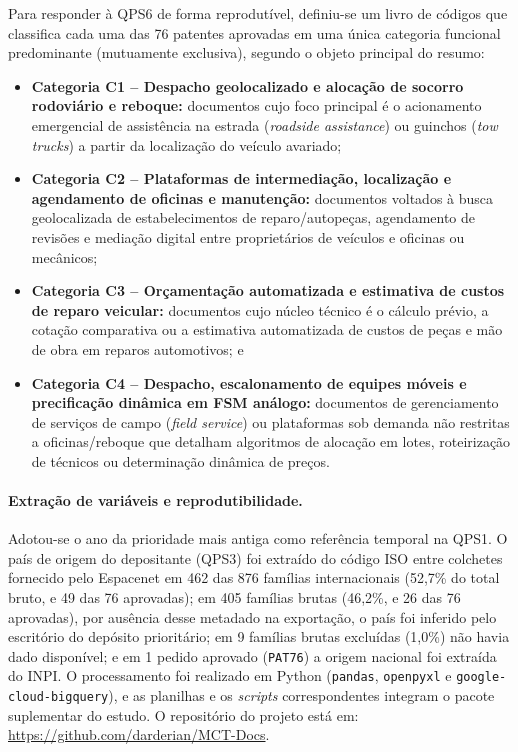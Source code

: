 \documentclass[12pt,a4paper]{article}
\begin{document}
Para responder à QPS6 de forma reprodutível, definiu-se um livro de códigos que classifica cada uma das 76 patentes aprovadas em uma única categoria funcional predominante (mutuamente exclusiva), segundo o objeto principal do resumo:
\begin{itemize}
    \item \textbf{Categoria C1 -- Despacho geolocalizado e alocação de socorro rodoviário e reboque:} documentos cujo foco principal é o acionamento emergencial de assistência na estrada (\textit{roadside assistance}) ou guinchos (\textit{tow trucks}) a partir da localização do veículo avariado;
    \item \textbf{Categoria C2 -- Plataformas de intermediação, localização e agendamento de oficinas e manutenção:} documentos voltados à busca geolocalizada de estabelecimentos de reparo/autopeças, agendamento de revisões e mediação digital entre proprietários de veículos e oficinas ou mecânicos;
    \item \textbf{Categoria C3 -- Orçamentação automatizada e estimativa de custos de reparo veicular:} documentos cujo núcleo técnico é o cálculo prévio, a cotação comparativa ou a estimativa automatizada de custos de peças e mão de obra em reparos automotivos; e
    \item \textbf{Categoria C4 -- Despacho, escalonamento de equipes móveis e precificação dinâmica em FSM análogo:} documentos de gerenciamento de serviços de campo (\textit{field service}) ou plataformas sob demanda não restritas a oficinas/reboque que detalham algoritmos de alocação em lotes, roteirização de técnicos ou determinação dinâmica de preços.
\end{itemize}

\paragraph{Extração de variáveis e reprodutibilidade.} Adotou-se o ano da prioridade mais antiga como referência temporal na QPS1. O país de origem do depositante (QPS3) foi extraído do código ISO entre colchetes fornecido pelo Espacenet em 462 das 876 famílias internacionais (52,7\% do total bruto, e 49 das 76 aprovadas); em 405 famílias brutas (46,2\%, e 26 das 76 aprovadas), por ausência desse metadado na exportação, o país foi inferido pelo escritório do depósito prioritário; em 9 famílias brutas excluídas (1,0\%) não havia dado disponível; e em 1 pedido aprovado (\texttt{PAT76}) a origem nacional foi extraída do INPI. O processamento foi realizado em Python (\texttt{pandas}, \texttt{openpyxl} e \texttt{google-cloud-bigquery}), e as planilhas e os \textit{scripts} correspondentes integram o pacote suplementar do estudo. O repositório do projeto está em: \url{https://github.com/darderian/MCT-Docs}.
\end{document}
